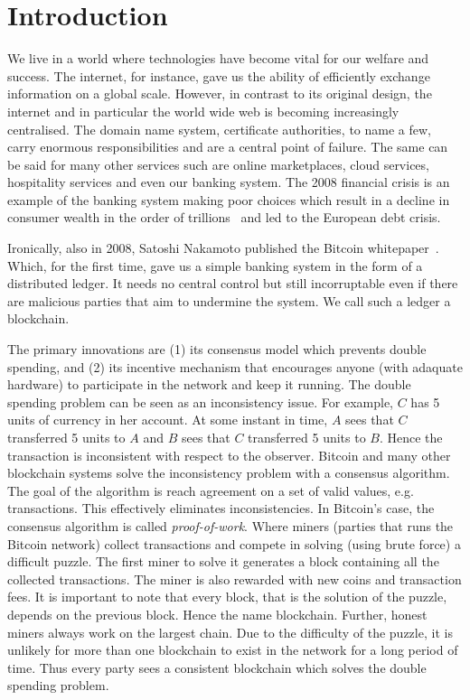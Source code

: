 \chapter{Introduction}
\label{ch:intro}

We live in a world where technologies have become vital for our welfare and success.
The internet, for instance, gave us the ability of efficiently exchange information on a global scale.
However, in contrast to its original design, the internet and in particular the world wide web is becoming increasingly centralised.
The domain name system, certificate authorities, to name a few, carry enormous responsibilities and are a central point of failure.
The  same can be said for many other services such are online marketplaces,
cloud services, hospitality services and even our banking system.
The 2008 financial crisis is an example of the banking system making poor choices which result in a
decline in consumer wealth in the order of trillions~\cite{financialcrisis} and led to the European debt crisis.

Ironically, also in 2008, Satoshi Nakamoto published the Bitcoin whitepaper~\cite{bitcoin}.
Which, for the first time, gave us a simple banking system in the form of a distributed ledger.
It needs no central control but still incorruptable even if there are malicious parties that aim to undermine the system.
We call such a ledger a blockchain.

The primary innovations are (1) its consensus model which prevents double spending,
and (2) its incentive mechanism that encourages anyone (with adaquate hardware) to participate in the network and keep it running.
The double spending problem can be seen as an inconsistency issue.
For example, $C$ has 5 units of currency in her account.
At some instant in time, $A$ sees that $C$ transferred 5 units to $A$ and $B$ sees that $C$ transferred 5 units to $B$.
Hence the transaction is inconsistent with respect to the observer.
Bitcoin and many other blockchain systems solve the inconsistency problem with a consensus algorithm.
The goal of the algorithm is reach agreement on a set of valid values, e.g. transactions. 
This effectively eliminates inconsistencies.
In Bitcoin's case, the consensus algorithm is called \emph{proof-of-work}.
Where miners (parties that runs the Bitcoin network) collect transactions and compete in solving (using brute force) a difficult puzzle.
The first miner to solve it generates a block containing all the collected transactions.
The miner is also rewarded with new coins and transaction fees.
It is important to note that every block, that is the solution of the puzzle,
depends on the previous block.
Hence the name blockchain.
Further, honest miners always work on the largest chain.
Due to the difficulty of the puzzle,
it is unlikely for more than one blockchain to exist in the network for a long period of time.
Thus every party sees a consistent blockchain which solves the double spending problem.

